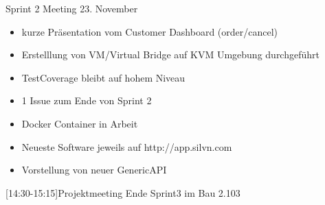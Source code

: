 
\begin{Protokoll}{Sprint 2 Meeting 23. November}
\protokollKopf

\begin{itemize}
  \item kurze Präsentation vom Customer Dashboard (order/cancel)
  \item Erstelllung von VM/Virtual Bridge auf KVM Umgebung durchgeführt
\end{itemize}


\begin{itemize}
  \item TestCoverage bleibt auf hohem Niveau
  \item 1 Issue zum Ende von Sprint 2
\end{itemize}

\begin{itemize}
  \item Docker Container in Arbeit
  \item Neueste Software jeweils auf http://app.silvn.com
\end{itemize}

\begin{itemize}
  \item Vorstellung von neuer GenericAPI
\end{itemize}


[14:30-15:15]{Projektmeeting Ende Sprint3 im Bau 2.103}



\end{Protokoll}

